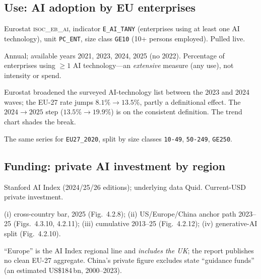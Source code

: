 \documentclass[11pt,a4paper]{article}
\newcommand{\code}[1]{\texttt{#1}}
\newcommand{\dataset}[1]{\textsc{#1}}
\begin{document}
\subsection{Use: AI adoption by EU enterprises}
\begin{description}[leftmargin=1.4em,style=nextline]
\item[Source / code] Eurostat \dataset{isoc\_eb\_ai}, indicator \code{E\_AI\_TANY}
  (enterprises using at least one AI technology), unit \code{PC\_ENT}, size class
  \code{GE10} (10+ persons employed). Pulled live.
\item[Coverage / units] Annual; available years 2021, 2023, 2024, 2025 (no 2022).
  Percentage of enterprises using $\ge 1$ AI technology---an \emph{extensive}
  measure (any use), not intensity or spend.
\item[Caveat: series break] Eurostat broadened the surveyed AI-technology list
  between the 2023 and 2024 waves; the EU-27 rate jumps $8.1\%\to 13.5\%$, partly
  a definitional effect. The $2024\to 2025$ step ($13.5\%\to 19.9\%$) is on the
  consistent definition. The trend chart shades the break.
\item[Firm size] The same series for \code{EU27\_2020}, split by size classes
  \code{10-49}, \code{50-249}, \code{GE250}.
\end{description}

\subsection{Funding: private AI investment by region}
\begin{description}[leftmargin=1.4em,style=nextline]
\item[Source] Stanford AI Index (2024/25/26 editions); underlying data Quid.
  Current-USD private investment.
\item[Views] (i) cross-country bar, 2025 (Fig.~4.2.8); (ii) US/Europe/China
  anchor path 2023--25 (Figs.~4.3.10, 4.2.11); (iii) cumulative 2013--25
  (Fig.~4.2.12); (iv) generative-AI split (Fig.~4.2.10).
\item[Caveat] ``Europe'' is the AI Index regional line and \emph{includes the
  UK}; the report publishes no clean EU-27 aggregate. China's private figure
  excludes state ``guidance funds'' (an estimated US\$184\,bn, 2000--2023).
\end{description}
\end{document}
